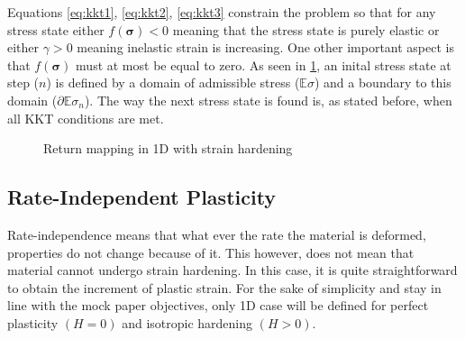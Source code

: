 \documentclass[final,5p,times,twocolumn]{elsarticle}
\begin{document}
Equations \ref{eq:kkt1}, \ref{eq:kkt2}, \ref{eq:kkt3} constrain the problem so that for any stress state either $f(\boldsymbol{\sigma}) < 0$ meaning that the stress state is purely elastic or either $\gamma > 0$ meaning inelastic strain is increasing. One other important aspect is that $f(\boldsymbol{\sigma})$ must at most be equal to zero. As seen in \cref{fig:returnmap}, an inital stress state at step ($n$) is defined by a domain of admissible stress ($\mathbb{E} \sigma$) and a boundary to this domain ($\partial \mathbb{E}\sigma_{n}$). The way the next stress state is found is, as stated before, when all KKT conditions are met.  

\begin{figure}
\centering
{}
\caption{Return mapping in 1D with strain hardening}
\label{fig:returnmap}
\end{figure}


\subsection{Rate-Independent Plasticity}
\label{sub:Rate-Independent Plasticity}
Rate-independence means that what ever the rate the material is deformed, properties do not change because of it. This however, does not mean that material cannot undergo strain hardening. In this case, it is quite straightforward to obtain the increment of plastic strain. For the sake of simplicity and stay in line with the mock paper objectives, only 1D case will be defined for perfect plasticity $(H=0)$ and isotropic hardening $(H>0)$.
\end{document}
